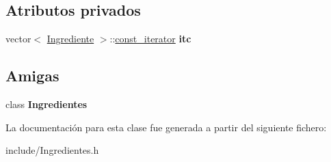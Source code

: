 \subsection*{Atributos privados}
\begin{DoxyCompactItemize}
\item 
\mbox{\label{classIngredientes_1_1const__iterator_a7cdf80cc8a445e295108520232e1de12}} 
vector$<$ \hyperlink{classIngrediente}{Ingrediente} $>$\+::\hyperlink{classIngredientes_1_1const__iterator}{const\+\_\+iterator} {\bfseries itc}
\end{DoxyCompactItemize}
\subsection*{Amigas}
\begin{DoxyCompactItemize}
\item 
\mbox{\label{classIngredientes_1_1const__iterator_a1a8c7f96971fda9a9b26b6d2a72e548b}} 
class {\bfseries Ingredientes}
\end{DoxyCompactItemize}


La documentación para esta clase fue generada a partir del siguiente fichero\+:\begin{DoxyCompactItemize}
\item 
include/Ingredientes.\+h\end{DoxyCompactItemize}
